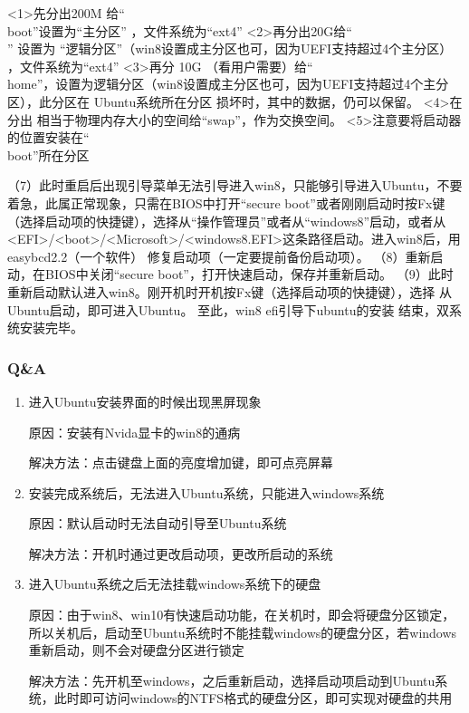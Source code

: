 <1>先分出200M 给“\\boot”设置为“主分区” ，文件系统为“ext4” 
<2>再分出20G给“\\” 设置为 “逻辑分区”（win8设置成主分区也可，因为UEFI支持超过4个主分区） ，文件系统为“ext4”  
<3>再分 10G （看用户需要）给“\\home”，设置为逻辑分区（win8设置成主分区也可，因为UEFI支持超过4个主分区），此分区在 Ubuntu系统所在分区 损坏时，其中的数据，仍可以保留。
<4>在分出 相当于物理内存大小的空间给“swap”，作为交换空间。
<5>注意要将启动器的位置安装在“\\boot”所在分区 

（7）此时重启后出现引导菜单无法引导进入win8，只能够引导进入Ubuntu，不要着急，此属正常现象，只需在BIOS中打开“secure boot”或者刚刚启动时按Fx键（选择启动项的快捷键），选择从“操作管理员”或者从“windows8”启动，或者从<EFI>/<boot>/<Microsoft>/<windows8.EFI>这条路径启动。进入win8后，用easybcd2.2（一个软件） 修复启动项（一定要提前备份启动项）。
（8）重新启动，在BIOS中关闭“secure boot”，打开快速启动，保存并重新启动。
（9）此时重新启动默认进入win8。刚开机时开机按Fx键（选择启动项的快捷键），选择 从Ubuntu启动，即可进入Ubuntu。
至此，win8 efi引导下ubuntu的安装 结束，双系统安装完毕。

\subsubsection{Q\&A}
\begin{enumerate}
	\item 进入Ubuntu安装界面的时候出现黑屏现象
	
	原因：安装有Nvida显卡的win8的通病
	
	解决方法：点击键盘上面的亮度增加键，即可点亮屏幕
	\item 安装完成系统后，无法进入Ubuntu系统，只能进入windows系统
	
	原因：默认启动时无法自动引导至Ubuntu系统
	
	解决方法：开机时通过更改启动项，更改所启动的系统
	\item 进入Ubuntu系统之后无法挂载windows系统下的硬盘
	
	原因：由于win8、win10有快速启动功能，在关机时，即会将硬盘分区锁定，所以关机后，启动至Ubuntu系统时不能挂载windows的硬盘分区，若windows重新启动，则不会对硬盘分区进行锁定
	
	解决方法：先开机至windows，之后重新启动，选择启动项启动到Ubuntu系统，此时即可访问windows的NTFS格式的硬盘分区，即可实现对硬盘的共用
\end{enumerate}

